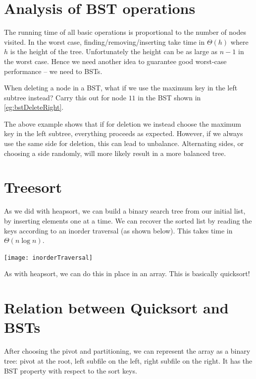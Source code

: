 \section{Analysis of BST operations}
The running time of all basic operations is proportional to the number of 
nodes visited. In the worst case, finding/removing/inserting take time in $\Theta(h)$ 
where $h$ is the height of the tree. 
Unfortunately the height can be as large as $n-1$ in the worst case. 
Hence we need another idea to guarantee good worst-case performance -- we need to  BSTs.

\begin{Boxample}[5] \label{eg:bstDeleteLeft}
When deleting a node  in a BST, what if we use the maximum key in the left subtree instead?
Carry this out for node $11$ in the BST shown in \cref{eg:bstDeleteRight}.
\end{Boxample}

The above example shows that if for deletion we instead choose the maximum key in the left subtree, everything proceeds as expected. 
However, if we always use the same side for deletion, this can lead to unbalance. 
Alternating sides, or choosing a side randomly, will more likely result in a more balanced tree.


\section{Treesort}
As we did with heapsort, we can build a binary search tree from our initial list, by inserting elements one at a time. 
We can recover the sorted list by reading the keys according to an inorder traversal (as shown below). 
This takes time in $\Theta(n \log n)$.
\begin{center}
  \texttt{[image: inorderTraversal]}
\end{center}

As with heapsort, we can do this in place in an array. This is basically quicksort!

\section{Relation between Quicksort and BSTs}
After choosing the pivot and partitioning, we can represent the array as a 
binary tree: pivot at the root, left subfile on the left, right subfile on the 
right. It has the BST property with respect to the sort keys.

